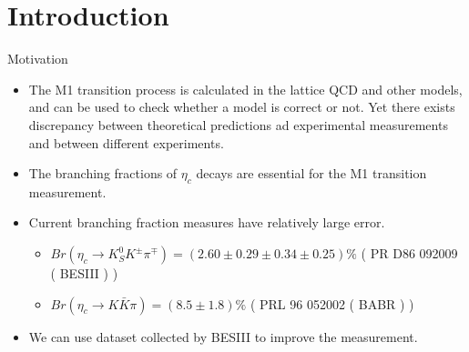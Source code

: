 \documentclass{beamer}
\begin{document}
\section{Introduction}
\begin{frame}{Motivation}
    \begin{itemize}
        \item The M1 transition process is calculated in the lattice QCD and other models, and can be used to check whether a model is correct or not. Yet there exists discrepancy between theoretical predictions ad experimental measurements and between different experiments.
        \item The branching fractions of $\eta_c$ decays are essential for the M1 transition measurement.
        \item Current branching fraction measures have relatively large error.
            \begin{itemize}
                \item \tiny{$Br(\eta_c\to K_S^0 K^{\pm} \pi^{\mp}) = ( 2.60\pm 0.29\pm0.34\pm0.25)\%$ ( PR D86 092009 ( BESIII ) )}
                \item $Br( \eta_c\to K \bar{K}\pi ) = ( 8.5\pm 1.8 )\%$ ( PRL 96 052002 ( BABR ) ) 
            \end{itemize}
        \item We can use dataset collected by BESIII to improve the measurement.
    \end{itemize}
\end{frame}
\end{document}
